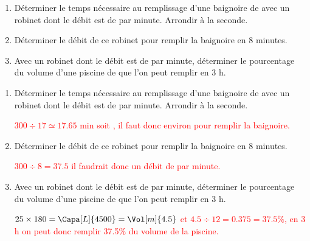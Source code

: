 \begin{exercice*}
    \begin{enumerate}
        \item Déterminer le temps nécessaire au remplissage d'une baignoire de  avec un robinet dont le débit 
        est de  par minute. Arrondir à la seconde.
        \item Déterminer le débit de ce robinet pour remplir la baignoire en 8 minutes.
        \item Avec un robinet dont le débit est de  par minute, déterminer le pourcentage du volume d'une piscine de  que l'on peut remplir en 3 h.
    \end{enumerate}
\end{exercice*}
\begin{corrige}
    \begin{enumerate}
        \item Déterminer le temps nécessaire au remplissage d'une baignoire de  avec un robinet dont le débit 
        est de  par minute. Arrondir à la seconde.
        \par\textcolor{red}{$300\div 17\simeq\num{17.65}\text{ min}$ soit , il faut donc environ  pour remplir la baignoire.}
        \item Déterminer le débit de ce robinet pour remplir la baignoire en 8 minutes.
        \par\textcolor{red}{$300\div 8 = \num{37.5}$ il faudrait donc un débit de  par minute.}
        \item Avec un robinet dont le débit est de  par minute, déterminer le pourcentage du volume d'une piscine de  que l'on peut remplir en 3 h.
        \par\textcolor{red}{$25\times 180 = \Capa[L]{4500} = \Vol[m]{4.5}$ et $\num{4.5}\div 12 = \num{0.375}=\num{37.5}\%$, en 3 h on peut donc remplir \num{37.5}\% du volume de la piscine.}
    \end{enumerate}
\end{corrige}

